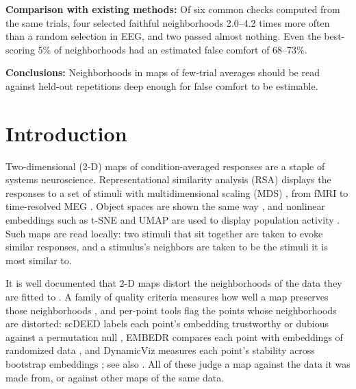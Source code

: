 \documentclass[11pt]{article}
\newcommand{\BmEnrichLo}{2.0}
\newcommand{\BmEnrichHi}{4.2}
\newcommand{\BmFiveLo}{68}
\newcommand{\BmFiveHi}{73}
\begin{document}
\noindent\textbf{Comparison with existing methods:} Of six common checks computed from the same trials, four selected faithful neighborhoods \BmEnrichLo--\BmEnrichHi{} times more often than a random selection in EEG, and two passed almost nothing.
Even the best-scoring 5\% of neighborhoods had an estimated false comfort of \BmFiveLo--\BmFiveHi\%.

\noindent\textbf{Conclusions:} Neighborhoods in maps of few-trial averages should be read against held-out repetitions deep enough for false comfort to be estimable.

\section{Introduction}\label{sec:intro}

Two-dimensional (2-D) maps of condition-averaged responses are a staple of systems neuroscience.
Representational similarity analysis (RSA) displays the responses to a set of stimuli with multidimensional scaling (MDS) \citep{kriegeskorte2008,kriegeskorte2008neuron,nili2014}, from fMRI to time-resolved MEG \citep{cichy2014}.
Object spaces are shown the same way \citep{hebart2023}, and nonlinear embeddings such as t-SNE \citep{vandermaaten2008} and UMAP are used to display population activity \citep{cunningham2014,gardner2022}.
Such maps are read locally: two stimuli that sit together are taken to evoke similar responses, and a stimulus's neighbors are taken to be the stimuli it is most similar to.

It is well documented that 2-D maps distort the neighborhoods of the data they are fitted to \citep{wattenberg2016,kobak2019,chari2023,cooley2019,lause2024}.
A family of quality criteria measures how well a map preserves those neighborhoods \citep{venna2001,kaski2003,chen2009,lee2009,venna2010}, and per-point tools flag the points whose neighborhoods are distorted: scDEED labels each point's embedding trustworthy or dubious against a permutation null \citep{xia2024}, EMBEDR compares each point with embeddings of randomized data \citep{johnson2022}, and DynamicViz measures each point's stability across bootstrap embeddings \citep{sun2023}; see also \citet{liu2025}.
All of these judge a map against the data it was made from, or against other maps of the same data.
\end{document}
